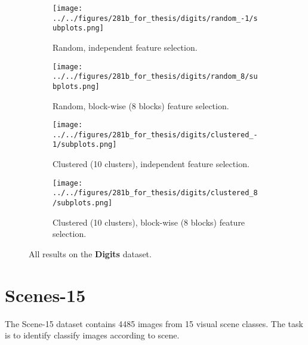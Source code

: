\begin{figure}[ht]
    \centering
    \begin{subfigure}[b]{.9\textwidth}
        \centering
        \texttt{[image: ../../figures/281b\_for\_thesis/digits/random\_-1/subplots.png]}
        \caption{Random, independent feature selection.\vspace{.2cm}}
    \end{subfigure}
    \begin{subfigure}[b]{.9\textwidth}
        \centering
        \texttt{[image: ../../figures/281b\_for\_thesis/digits/random\_8/subplots.png]}
        \caption{Random, block-wise (8 blocks) feature selection.\vspace{.2cm}}
    \end{subfigure}
    \begin{subfigure}[b]{\textwidth}
        \centering
        \texttt{[image: ../../figures/281b\_for\_thesis/digits/clustered\_-1/subplots.png]}
        \caption{Clustered (10 clusters), independent feature selection.\vspace{.2cm}}
    \end{subfigure}
    \begin{subfigure}[b]{\textwidth}
        \centering
        \texttt{[image: ../../figures/281b\_for\_thesis/digits/clustered\_8/subplots.png]}
        \caption{Clustered (10 clusters), block-wise (8 blocks) feature selection.\vspace{.2cm}}
    \end{subfigure}
    \caption{All results on the \textbf{Digits} dataset.}
    \label{fig:digits}
\end{figure}

\section{Scenes-15}
The Scene-15 dataset \parencite{Lazebnik-CVPR-2006} contains 4485 images from 15 visual scene classes.
The task is to identify classify images according to scene.

